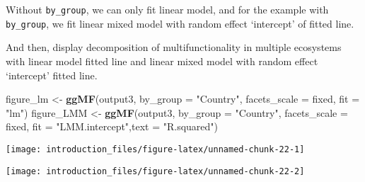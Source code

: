 \documentclass[
]{article}
\newenvironment{Shaded}{\begin{snugshade}}{\end{snugshade}}
\newcommand{\AttributeTok}[1]{\textcolor[rgb]{0.13,0.29,0.53}{#1}}
\newcommand{\FunctionTok}[1]{\textcolor[rgb]{0.13,0.29,0.53}{\textbf{#1}}}
\newcommand{\NormalTok}[1]{#1}
\newcommand{\OtherTok}[1]{\textcolor[rgb]{0.56,0.35,0.01}{#1}}
\newcommand{\SpecialCharTok}[1]{\textcolor[rgb]{0.81,0.36,0.00}{\textbf{#1}}}
\newcommand{\StringTok}[1]{\textcolor[rgb]{0.31,0.60,0.02}{#1}}
\begin{document}
Without \texttt{by\_group}, we can only fit linear model, and for the
example with \texttt{by\_group}, we fit linear mixed model with random
effect `intercept' of fitted line.

And then, display decomposition of multifunctionality in multiple
ecosystems with linear model fitted line and linear mixed model with
random effect `intercept' fitted line.

\begin{Shaded}
\begin{Highlighting}[]
\NormalTok{figure\_lm }\OtherTok{\textless{}{-}} \FunctionTok{ggMF}\NormalTok{(output3, }\AttributeTok{by\_group =} \StringTok{"Country"}\NormalTok{, }\AttributeTok{facets\_scale =} \StringTok{\textquotesingle{}fixed\textquotesingle{}}\NormalTok{, }\AttributeTok{fit =} \StringTok{"lm"}\NormalTok{)}
\NormalTok{figure\_LMM }\OtherTok{\textless{}{-}} \FunctionTok{ggMF}\NormalTok{(output3, }\AttributeTok{by\_group =} \StringTok{"Country"}\NormalTok{, }\AttributeTok{facets\_scale =} \StringTok{\textquotesingle{}fixed\textquotesingle{}}\NormalTok{, }\AttributeTok{fit =} \StringTok{"LMM.intercept"}\NormalTok{,}\AttributeTok{text =} \StringTok{"R.squared"}\NormalTok{)}
\end{Highlighting}
\end{Shaded}

\begin{Shaded}
\end{Shaded}

\begin{center}\texttt{[image: introduction\_files/figure-latex/unnamed-chunk-22-1]} \end{center}

\begin{Shaded}
\end{Shaded}

\begin{center}\texttt{[image: introduction\_files/figure-latex/unnamed-chunk-22-2]} \end{center}
\end{document}
